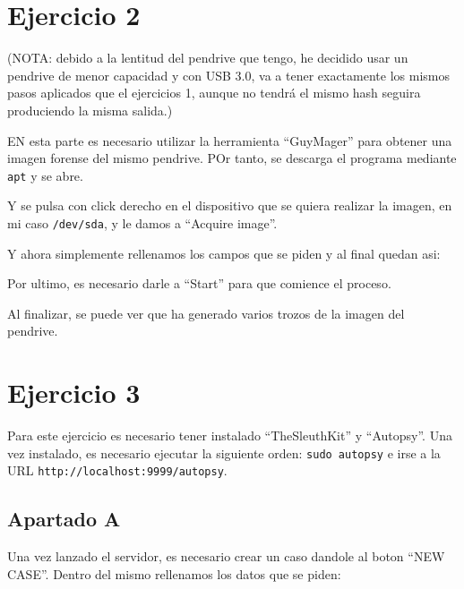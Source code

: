 \documentclass{article}
\begin{document}
\section*{Ejercicio 2}

(NOTA: debido a la lentitud del pendrive que tengo, he decidido usar un pendrive de menor capacidad y con USB 3.0, va a tener exactamente los mismos pasos aplicados que el ejercicios 1, aunque no tendrá el mismo hash seguira produciendo la misma salida.)

EN esta parte es necesario utilizar la herramienta ``GuyMager'' para obtener una imagen forense del mismo pendrive. POr tanto, se descarga el programa mediante \verb|apt| y se abre.


Y se pulsa con click derecho en el dispositivo que se quiera realizar la imagen, en mi caso \verb|/dev/sda|, y le damos a ``Acquire image''.


Y ahora simplemente rellenamos los campos que se piden y al final quedan asi:


Por ultimo, es necesario darle a ``Start'' para que comience el proceso.


Al finalizar, se puede ver que ha generado varios trozos de la imagen del pendrive.


\section*{Ejercicio 3}

Para este ejercicio es necesario tener instalado ``TheSleuthKit'' y ``Autopsy''. Una vez instalado, es necesario ejecutar la siguiente orden: \verb|sudo autopsy| e irse a la URL \verb|http://localhost:9999/autopsy|.


\subsection*{Apartado A}
Una vez lanzado el servidor, es necesario crear un caso dandole al boton ``NEW CASE''. Dentro del mismo rellenamos los datos que se piden:
\end{document}

